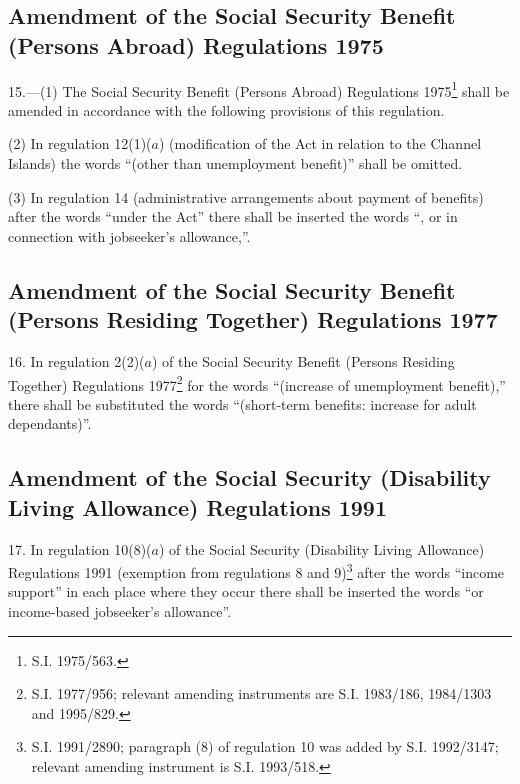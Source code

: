 \documentclass[a4paper]{article}
\begin{document}
\subsection[15. Amendment of the Social Security Benefit (Persons Abroad) Regulations 1975]{Amendment of the Social Security Benefit (Persons Abroad) Regulations 1975}

15.—(1) The Social Security Benefit (Persons Abroad) Regulations 1975\footnote{\frenchspacing S.I. 1975/563.} shall be amended in accordance with the following provisions of this regulation.

(2) In regulation 12(1)($a$) (modification of the Act in relation to the Channel Islands) the words “(other than unemployment benefit)” shall be omitted.

(3) In regulation 14 (administrative arrangements about payment of benefits) after the words “under the Act” there shall be inserted the words “, or in connection with jobseeker’s allowance,”.

\subsection[16. Amendment of the Social Security Benefit (Persons Residing Together) Regulations 1977]{Amendment of the Social Security Benefit (Persons Residing Together) Regulations 1977}

16.  In regulation 2(2)($a$) of the Social Security Benefit (Persons Residing Together) Regulations 1977\footnote{\frenchspacing S.I. 1977/956; relevant amending instruments are S.I. 1983/186, 1984/1303 and 1995/829.} for the words “(increase of unemployment benefit),” there shall be substituted the words “(short-term benefits: increase for adult dependants)”.

\subsection[17. Amendment of the Social Security (Disability Living Allowance) Regulations 1991]{\sloppy Amendment of the Social Security (Disability Living Allow\-ance) Regulations 1991}

17.  In regulation 10(8)($a$) of the Social Security (Disability Living Allowance) Regulations 1991 (exemption from regulations 8 and 9)\footnote{\frenchspacing S.I. 1991/2890; paragraph (8) of regulation 10 was added by S.I. 1992/3147; relevant amending instrument is S.I. 1993/518.} after the words “income support” in each place where they occur there shall be inserted the words “or income-based jobseeker’s allowance”.
\end{document}
